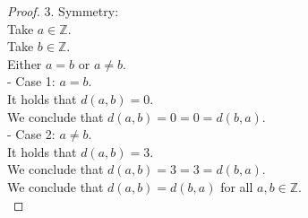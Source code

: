 \documentclass{article}
\newcommand\tab[1][1cm]{\hspace*{#1}}
\theoremstyle{mytheoremstyle}
\theoremstyle{mytheoremstyle}
\theoremstyle{myproblemstyle}
\begin{document}
\begin{proof}
        3. Symmetry: \\
        Take $a \in \mathbb{Z}$. \\
        Take $b \in \mathbb{Z}$. \\
        Either $a = b$ or $a \ne b$. \\
        - Case 1: $a = b$. \\
        \tab It holds that $d(a,b) = 0$. \\
        \tab We conclude that $d(a,b) = 0 = 0 = d(b,a)$. \\
        - Case 2: $a \ne b$. \\
        \tab It holds that $d(a,b) = 3$. \\
        \tab We conclude that $d(a,b) = 3 = 3 = d(b,a)$. \\
        We conclude that $d(a,b) = d(b,a)$ for all $a,b \in \mathbb{Z}$. \\


\end{proof}
\end{document}

